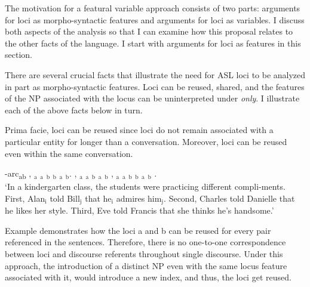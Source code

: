 \documentclass[output=paper,
modfonts
]{langscibook}
\begin{document}
The motivation for a featural variable approach consists of two parts: arguments for loci as morpho-syntactic features and arguments for loci as variables. I discuss both aspects of the analysis so that I can examine how this proposal relates to the other facts of the language. I start with arguments for loci as features in this section. 

There are several crucial facts that illustrate the need for ASL loci to be analyzed in part as morpho-syntactic features. Loci can be reused, shared, and the features of the NP associated with the locus can be uninterpreted under \textit{only}. I illustrate each of the above facts below in turn. 

Prima facie, loci can be reused since loci do not remain associated with a particular entity for longer than a conversation. Moreover, loci can be reused even within the same conversation.

\begin{exe} 
	\ex \label{ex:irani:68}  -arc\textsubscript{ab}  , $_\text{a}$ $_\text{a}$  $_\text{b}$ $_\text{b}$ $_\text{a}$  $_\text{b}$. , $_\text{a}$ $_\text{a}$  $_\text{b}$  $_\text{a}$ $_\text{b}$ , $_\text{a}$ $_\text{a}$  $_\text{b}$ $_\text{b}$ $_\text{a}$  $_\text{b}$ .\\
	`In a kindergarten class, the students were practicing different compli-\linebreak ments. First, Alan$_\text{i}$ told Bill$_\text{j}$ that he$_\text{i}$ admires him$_\text{j}$. Second, Charles told Danielle that he likes her style. Third, Eve told Francis that she thinks he's handsome.' \citep[adapted from][462]{Kuhn2015}
\end{exe} 

Example  demonstrates how the loci a and b can be reused for every pair referenced in the sentences. Therefore, there is no one-to-one correspondence between loci and discourse referents throughout single discourse. Under this approach, the introduction of a distinct NP even with the same locus feature associated with it, would introduce a new index, and thus, the loci get reused. 
\end{document}
